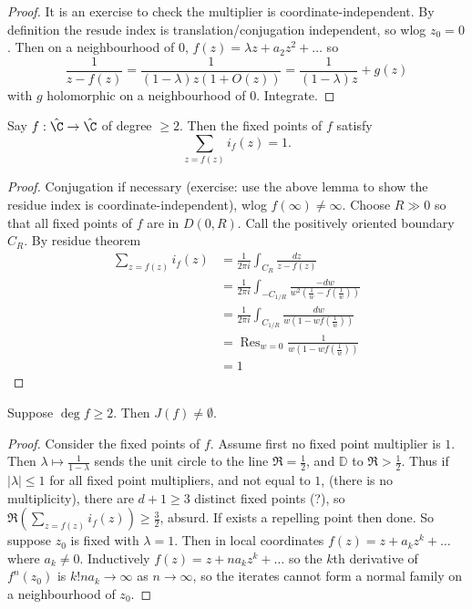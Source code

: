 \documentclass[a4paper]{article}
\newcommand{\D}{\mathbb{D}}
\begin{document}
\begin{proof}
  It is an exercise to check the multiplier is coordinate-independent. By definition the resude index is translation/conjugation independent, so wlog \(z_0 = 0\). Then on a neighbourhood of \(0\), \(f(z) = \lambda z + a_2z^2 + \dots\) so
  \[
    \frac{1}{z - f(z)} = \frac{1}{(1 - \lambda) z (1 + O(z))} = \frac{1}{(1 - \lambda) z} + g(z)
  \]
  with \(g\) holomorphic on a neighbourhood of \(0\). Integrate.
\end{proof}

\begin{theorem}
  Say \(f: \hat \C \to \hat \C\) of degree \(\geq 2\). Then the fixed points of \(f\) satisfy
  \[
    \sum_{z = f(z)} i_f(z) = 1.
  \]
\end{theorem}

\begin{proof}
  Conjugation if necessary (exercise: use the above lemma to show the residue index is coordinate-independent), wlog \(f(\infty) \ne \infty\). Choose \(R \gg 0\) so that all fixed points of \(f\) are in \(D(0, R)\). Call the positively oriented boundary \(C_R\). By residue theorem
  \begin{align*}
    \sum_{z = f(z)} i_f(z)
    &= \frac{1}{2\pi i} \int_{C_R} \frac{dz}{z - f(z)} \\
    &= \frac{1}{2\pi i} \int_{-C_{1/R}} \frac{-dw}{w^2(\frac{1}{w} - f(\frac{1}{w}))} \\
    &= \frac{1}{2\pi i} \int_{C_{1/R}} \frac{dw}{w(1 - wf(\frac{1}{w}))} \\
    &= \operatorname{Res}_{w = 0} \frac{1}{w(1 - wf(\frac{1}{w}))} \\
    &= 1
  \end{align*}
\end{proof}

\begin{corollary}
  Suppose \(\deg f \geq 2\). Then \(J(f) \ne \emptyset\).
\end{corollary}

\begin{proof}
  Consider the fixed points of \(f\). Assume first no fixed point multiplier is \(1\). Then \(\lambda \mapsto \frac{1}{1 - \lambda}\) sends the unit circle to the line \(\Re = \frac{1}{2}\), and \(\D\) to \(\Re > \frac{1}{2}\). Thus if \(|\lambda| \leq 1\) for all fixed point multipliers, and not equal to \(1\), (there is no multiplicity), there are \(d + 1 \geq 3\) distinct fixed points (?), so \(\Re( \sum_{z = f(z)} i_f(z)) \geq \frac{3}{2}\), absurd. If exists a repelling point then done. So suppose \(z_0\) is fixed with \(\lambda = 1\). Then in local coordinates \(f(z) = z + a_kz^k + \dots\) where \(a_k \ne 0\). Inductively \(f(z) = z + na_kz^k + \dots\) so the \(k\)th derivative of \(f^n(z_0)\) is \(k! na_k \to \infty\) as \(n \to \infty\), so the iterates cannot form a normal family on a neighbourhood of \(z_0\).
\end{proof}
\end{document}
